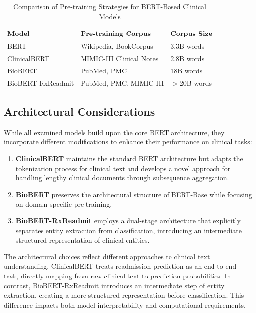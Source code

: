 \documentclass[3p,times,procedia]{elsarticle}
\begin{document}
\begin{table}[h]
\centering
\caption{Comparison of Pre-training Strategies for BERT-Based Clinical Models}
\label{tab:pretraining_comparison}
\begin{tabular}{|l|l|l|}
\hline
\textbf{Model} & \textbf{Pre-training Corpus} & \textbf{Corpus Size} \\ \hline
BERT & Wikipedia, BookCorpus & 3.3B words \\ \hline
ClinicalBERT & MIMIC-III Clinical Notes & 2.8B words \\ \hline
BioBERT & PubMed, PMC & 18B words \\ \hline
BioBERT-RxReadmit & PubMed, PMC, MIMIC-III &  $>$20B words \\ \hline
\end{tabular}
\end{table}

\subsection{Architectural Considerations}

While all examined models build upon the core BERT architecture, they incorporate different modifications to enhance their performance on clinical tasks:

\begin{enumerate}
    \item \textbf{ClinicalBERT} maintains the standard BERT architecture but adapts the tokenization process for clinical text and develops a novel approach for handling lengthy clinical documents through subsequence aggregation.
    
    \item \textbf{BioBERT} preserves the architectural structure of BERT-Base while focusing on domain-specific pre-training.
    
    \item \textbf{BioBERT-RxReadmit} employs a dual-stage architecture that explicitly separates entity extraction from classification, introducing an intermediate structured representation of clinical entities.
\end{enumerate}

The architectural choices reflect different approaches to clinical text understanding. ClinicalBERT treats readmission prediction as an end-to-end task, directly mapping from raw clinical text to prediction probabilities. In contrast, BioBERT-RxReadmit introduces an intermediate step of entity extraction, creating a more structured representation before classification. This difference impacts both model interpretability and computational requirements.
\end{document}
